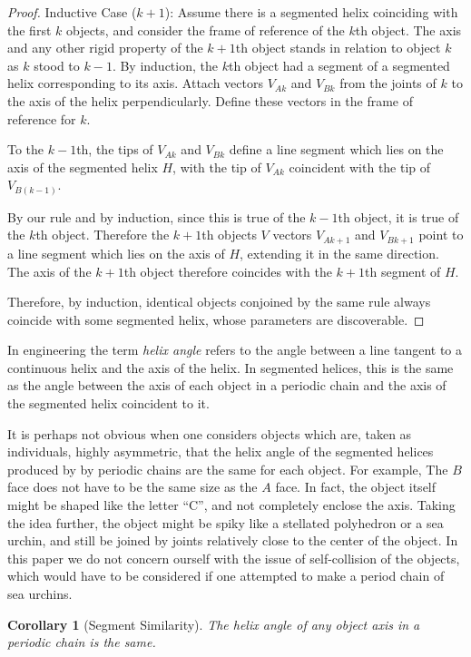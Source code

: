 \documentclass[11pt]{article}
\newtheorem{corollary}{Corollary}
\begin{document}
{\begin{proof}
  Inductive Case ($k+1$):
  Assume there is a segmented helix coinciding with the first $k$ objects, and
  consider the frame of reference of the $k$th object. The axis and any
  other rigid property of the $k+1$th object stands in relation to object $k$
  as $k$ stood to $k-1$. By induction, the $k$th object had a segment
  of a segmented helix corresponding to its axis. Attach vectors $V_{Ak}$ and $V_{Bk}$
  from the
  joints of $k$ to the axis of the helix perpendicularly. Define these
  vectors in the frame of reference for $k$.

  To the $k-1$th, the tips of  $V_{Ak}$ and $V_{Bk}$ define
  a line segment which lies on the axis of the segmented helix $H$, with the
  tip of $V_{Ak}$ coincident with the tip of $V_{B(k-1)}$.

  By our rule and by induction, since this is true of the $k-1$th object,
  it is true of the $k$th object. Therefore the $k+1$th objects $V$ vectors $V_{Ak+1}$ and $V_{Bk+1}$
  point to a line segment which lies on the axis of $H$, extending it
  in the same direction. The axis of the $k+1$th object therefore coincides
  with the $k+1$th segment of $H$.

  Therefore, by induction, identical objects conjoined by the same rule always
  coincide with some segmented helix, whose parameters are discoverable.
\end{proof}

In engineering the term {\em helix angle} refers
to the angle between a line tangent to a continuous helix and
the axis of the helix. In segmented helices, this is the same
as the angle between the
axis of each object in a periodic chain and the axis of the
segmented helix coincident to it.

It is perhaps not obvious when one considers
objects which are, taken as individuals, highly asymmetric,
that the helix angle of the segmented helices produced by
by periodic chains are the same for each object.
For example,
The $B$ face does not have to be the same size as the $A$ face. In fact,
the object itself might be shaped like the letter ``C'', and not completely
enclose the axis. Taking the idea further, the object might be spiky
like a stellated polyhedron or a sea urchin, and still be joined by
joints relatively close to the center of the object. In this paper
we do not concern ourself with the issue of self-collision of the objects,
which would have to be considered if one attempted to make a period chain
of sea urchins.

\begin{corollary}[Segment Similarity]
  The helix angle of any object axis in a periodic chain is the same.
  \label{cor:symmetric}
\end{corollary}

}
\end{document}
